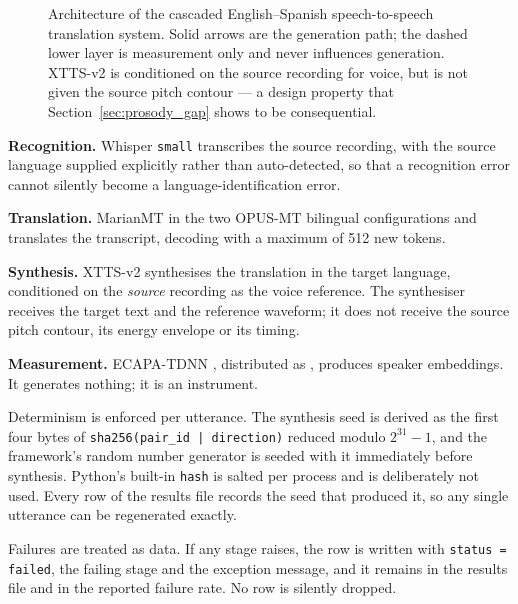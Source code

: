 \begin{figure}[htbp]
\caption{Architecture of the cascaded English--Spanish speech-to-speech translation system. Solid
arrows are the generation path; the dashed lower layer is measurement only and never influences
generation. XTTS-v2 is conditioned on the source recording for voice, but is not given the source
pitch contour --- a design property that Section~\ref{sec:prosody_gap} shows to be consequential.}
\label{fig:architecture}
\end{figure}

\textbf{Recognition.} Whisper \texttt{small} \cite{radford2023whisper} transcribes the source
recording, with the source language supplied explicitly rather than auto-detected, so that a
recognition error cannot silently become a language-identification error.

\textbf{Translation.} MarianMT \cite{junczysdowmunt2018marian} in the two OPUS-MT bilingual
configurations  and 
\cite{tiedemann2020opusmt} translates the transcript, decoding with a maximum of 512 new tokens.

\textbf{Synthesis.} XTTS-v2 \cite{casanova2024xtts} synthesises the translation in the target
language, conditioned on the \emph{source} recording as the voice reference. The synthesiser
receives the target text and the reference waveform; it does not receive the source pitch contour,
its energy envelope or its timing.

\textbf{Measurement.} ECAPA-TDNN \cite{desplanques2020ecapa}, distributed as
 \cite{ravanelli2021speechbrain}, produces speaker
embeddings. It generates nothing; it is an instrument.

Determinism is enforced per utterance. The synthesis seed is derived as the first four bytes of
\texttt{sha256(pair\_id\,|\,direction)} reduced modulo $2^{31}-1$, and the framework's random
number generator is seeded with it immediately before synthesis. Python's built-in \texttt{hash} is
salted per process and is deliberately not used. Every row of the results file records the seed
that produced it, so any single utterance can be regenerated exactly.

Failures are treated as data. If any stage raises, the row is written with
\texttt{status = failed}, the failing stage and the exception message, and it remains in the
results file and in the reported failure rate. No row is silently dropped.

